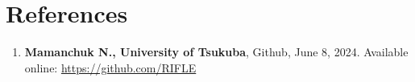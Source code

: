 \documentclass{article}
\begin{document}
\section*{References}
\begin{enumerate}
    \item \textbf{Mamanchuk N., University of Tsukuba}, Github, June 8, 2024. Available online: \url{https://github.com/RIFLE}
\end{enumerate}
\end{document}
